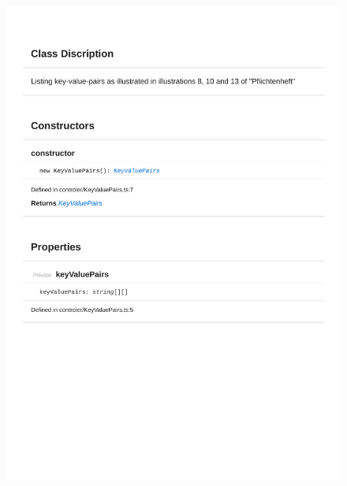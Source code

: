 \begin{figure}[H]
\centerline{\includegraphics[width=\textwidth]{FrontendDocsAsPDF/Model/KeyValuePairs.pdf}}
\end{figure}

